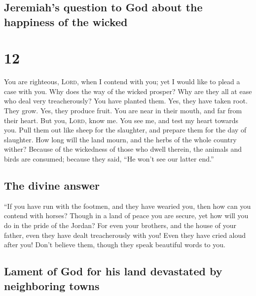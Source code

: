 \hypertarget{jeremiahs-question-to-god-about-the-happiness-of-the-wicked}{%
\subsection{Jeremiah's question to God about the happiness of the
wicked}\label{jeremiahs-question-to-god-about-the-happiness-of-the-wicked}}

\hypertarget{section-11}{%
\section{12}\label{section-11}}

 You are righteous, \textsc{Lord}, when I contend with
you; yet I would like to plead a case with you. Why does the way of the
wicked prosper? Why are they all at ease who deal very treacherously?
 You have planted them. Yes, they have taken root. They
grow. Yes, they produce fruit. You are near in their mouth, and far from
their heart.  But you, \textsc{Lord}, know me. You see me,
and test my heart towards you. Pull them out like sheep for the
slaughter, and prepare them for the day of slaughter.  How
long will the land mourn, and the herbs of the whole country wither?
Because of the wickedness of those who dwell therein, the animals and
birds are consumed; because they said, ``He won't see our latter end.''

\hypertarget{the-divine-answer}{%
\subsection{The divine answer}\label{the-divine-answer}}

 ``If you have run with the footmen, and they have wearied
you, then how can you contend with horses? Though in a land of peace you
are secure, yet how will you do in the pride of the Jordan?
 For even your brothers, and the house of your father,
even they have dealt treacherously with you! Even they have cried aloud
after you! Don't believe them, though they speak beautiful words to you.

\hypertarget{lament-of-god-for-his-land-devastated-by-neighboring-towns}{%
\subsection{Lament of God for his land devastated by neighboring
towns}\label{lament-of-god-for-his-land-devastated-by-neighboring-towns}}

